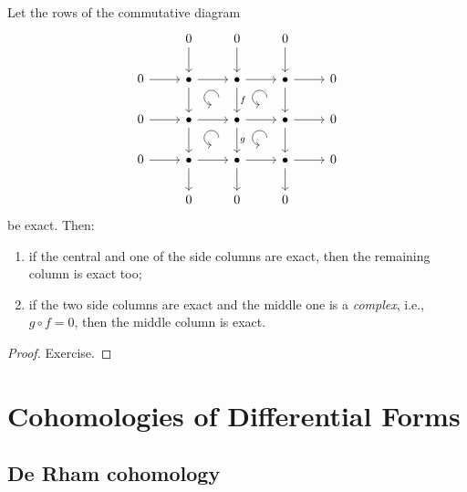 \begin{lem}\label{3x3-lemma}
    Let the rows of the commutative diagram
    \[\begin{tikzcd}[every matrix/.append style={name=m},   
        execute at end picture={\draw [<-] ([xshift=-7mm,yshift=-9mm]m-2-3.north) arc[start angle=-90,delta angle=-270,radius=0.2cm];
        \draw [<-] ([xshift=-7mm,yshift=-9mm]m-2-4.north) arc[start angle=-90,delta angle=-270,radius=0.2cm];
        \draw [<-] ([xshift=-7mm,yshift=-9mm]m-3-3.north) arc[start angle=-90,delta angle=-270,radius=0.2cm];
        \draw [<-] ([xshift=-7mm,yshift=-9mm]m-3-4.north) arc[start angle=-90,delta angle=-270,radius=0.2cm];}]
        &0\arrow[d]&0\arrow[d]&0\arrow[d]&\\
        0\arrow[r]& \bullet \arrow[r]\arrow[d] & \bullet\arrow[r]\arrow[d,"f"] & \bullet \arrow[r]\arrow[d] & 0\\
        0\arrow[r]& \bullet \arrow[r]\arrow[d] & \bullet\arrow[r]\arrow[d,"g"] & \bullet \arrow[r]\arrow[d] & 0\\
       0\arrow[r]& \bullet\arrow[r]\arrow[d] & \bullet\arrow[r]\arrow[d] & \bullet\arrow[r]\arrow[d] &0\\
       &0&0&0&
    \end{tikzcd}\]
    be exact. Then:
    \begin{enumerate}
        \item if the central and one of the side columns are exact, then the remaining column is exact too;
        \item if the two side columns are exact and the middle one is a \emph{complex}, i.e., $g\circ f=0$, then the middle column is exact.
    \end{enumerate}
\end{lem}
\begin{proof}
    Exercise.
\end{proof}







\clearpage
\chapter{Cohomologies of Differential Forms \texorpdfstring{\ucmark}{}}

\section{De Rham cohomology}


